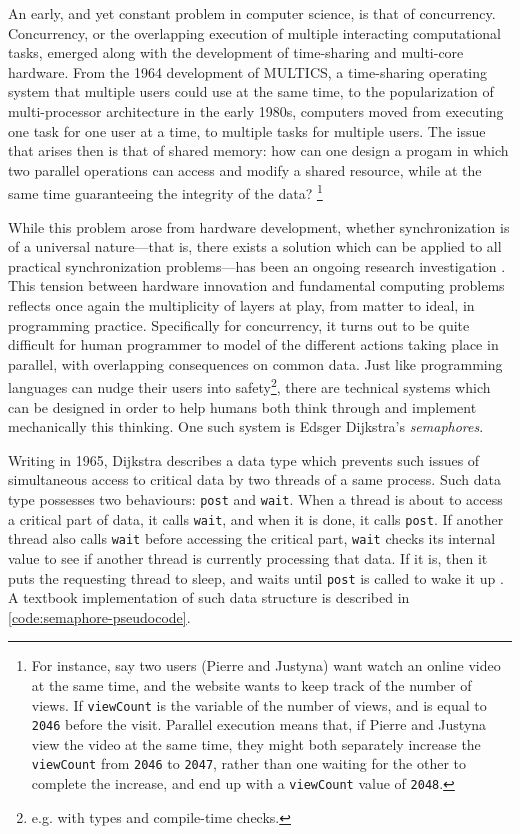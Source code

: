 An early, and yet constant problem in computer science, is that of concurrency. Concurrency, or the overlapping execution of multiple interacting computational tasks, emerged along with the development of time-sharing and multi-core hardware. From the 1964 development of MULTICS, a time-sharing operating system that multiple users could use at the same time, to the popularization of multi-processor architecture in the early 1980s, computers moved from executing one task for one user at a time, to multiple tasks for multiple users. The issue that arises then is that of shared memory: how can one design a progam in which two parallel operations can access and modify a shared resource, while at the same time guaranteeing the integrity of the data? \footnote{For instance, say two users (Pierre and Justyna) want watch an online video at the same time, and the website wants to keep track of the number of views. If \lstinline{viewCount} is the variable of the number of views, and is equal to \lstinline{2046} before the visit. Parallel execution means that, if Pierre and Justyna view the video at the same time, they might both separately increase the \lstinline{viewCount} from \lstinline{2046} to \lstinline{2047}, rather than one waiting for the other to complete the increase, and end up with a \lstinline{viewCount} value of \lstinline{2048}.}

While this problem arose from hardware development, whether synchronization is of a universal nature—that is, there exists a solution which can be applied to all practical synchronization problems—has been an ongoing research investigation \citep{leppajarvi_pragmatic_2008}. This tension between hardware innovation and fundamental computing problems reflects once again the multiplicity of layers at play, from matter to ideal, in programming practice. 
Specifically for concurrency, it turns out to be quite difficult for human programmer to model of the different actions taking place in parallel, with overlapping consequences on common data. Just like programming languages can nudge their users into safety\footnote{e.g. with types and compile-time checks.}, there are technical systems which can be designed in order to help humans both think through and implement mechanically this thinking. One such system is Edsger Dijkstra's \emph{semaphores}.

Writing in 1965, Dijkstra describes a data type which prevents such issues of simultaneous access to critical data by two threads of a same process. Such data type possesses two behaviours: \lstinline{post} and \lstinline{wait}. When a thread is about to access a critical part of data, it calls \lstinline{wait}, and when it is done, it calls \lstinline{post}. If another thread also calls \lstinline{wait} before accessing the critical part, \lstinline{wait} checks its internal value to see if another thread is currently processing that data. If it is, then it puts the requesting thread to sleep, and waits until \lstinline{post} is called to wake it up \citep{dijkstra_cooperating_1965}. A textbook implementation of such data structure is described in \ref{code:semaphore-pseudocode}.

